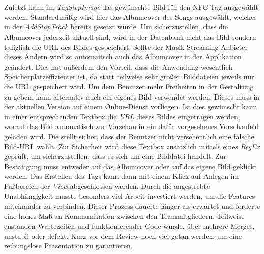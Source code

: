 \documentclass[10pt, a4paper]{article}
\begin{document}
\\~\\
Zuletzt kann im \textit{TagStepImage} das gewünschte Bild für den NFC-Tag ausgewählt werden. Standardmäßig wird hier das Albumcover des Songs ausgewählt, welches in der \textit{AddStapTrack} bereits gesetzt wurde. Um sicherzustellen, dass die Albumcover jederzeit aktuell sind, wird in der Datenbank nicht das Bild sondern lediglich die URL des Bildes gespeichert. Sollte der Musik-Streaming-Anbieter dieses Ändern wird so automaitsch auch das Albumcover in der Applikation geändert.
Dies hat außerdem den Vorteil, dass die Anwendung wesentlich Speicherplatzeffizienter ist, da statt teilweise sehr großen Bilddateien jeweils nur die URL gespeichert wird. Um dem Benutzer mehr Freiheiten in der Gestaltung zu geben, kann alternativ auch ein eigenes Bild verwendet werden. Dieses muss in der aktuellen Version auf einem Online-Dienst vorliegen. Ist dies gewünscht kann in einer entsprechenden
Textbox die \textit{URL} dieses Bildes eingetragen werden, worauf das Bild automatisch zur Vorschau in ein dafür vorgesehenes Vorschaufeld geladen wird. Die stellt sicher, dass der Benutzer nicht versehentlich eine falsche Bild-URL wählt. Zur Sicherheit wird diese Textbox zusätzlich mittels eines \textit{RegEx} geprüft, um sicherzustellen, dass es sich um eine Bilddatei handelt. Zur Bestätigung muss entweder auf das Albumcover oder auf das eigene Bild geklickt werden. Das Erstellen
des Tags kann dann mit einem Klick auf \glqq Anlegen \grqq{} im Fußbereich der \textit{View} abgeschlossen werden.
Durch die angestrebte Unabhängigkeit musste besonders viel Arbeit investiert werden, um die Features miteinander zu verbinden.
Dieser Prozess dauerte länger als erwartet und forderte eine hohes Maß an Kommunikation zwischen den Teammitgliedern.
Teilweise enstanden Wartezeiten und funktionierender Code wurde, über mehrere Merges, unstabil oder defekt.
Kurz vor dem Review noch viel getan werden, um eine reibungslose Präsentation zu garantieren.
\end{document}
